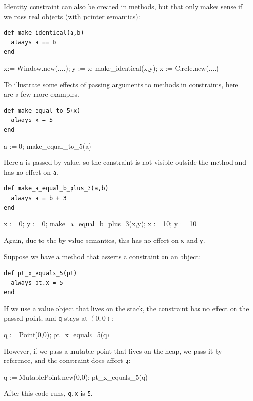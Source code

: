 \documentclass{article}
\newcounter{examples}
\begin{document}
Identity constraint can also be created in methods, but that only
makes sense if we pass real objects (with pointer semantics):
\begin{verbatim}
def make_identical(a,b)
  always a == b
end
\end{verbatim}

\begin{example}
x:= Window.new(....);
y := x;
make_identical(x,y);
x := Circle.new(....)
\end{example}

To illustrate some effects of passing arguments to methods in
constraints, here are a few more examples.

\begin{verbatim}
def make_equal_to_5(x)
  always x = 5
end
\end{verbatim}

\begin{example}
a := 0;
make_equal_to_5(a)
\end{example}
Here a is passed by-value, so the constraint is not visible outside
the method and has no effect on \verb!a!.

\begin{verbatim}
def make_a_equal_b_plus_3(a,b)
  always a = b + 3
end
\end{verbatim}

\begin{example}
x := 0;
y := 0;
make_a_equal_b_plus_3(x,y);
x := 10;
y := 10
\end{example}
Again, due to the by-value semantics, this has no effect on \verb!x!
and \verb!y!.

Suppose we have a method that asserts a constraint on an object:
\begin{verbatim}
def pt_x_equals_5(pt)
  always pt.x = 5
end
\end{verbatim}

If we use a value object that lives on the stack, the constraint has
no effect on the passed point, and \verb!q! stays at $(0,0)$:
\begin{example}
q := Point(0,0);
pt_x_equals_5(q)
\end{example}

However, if we pass a mutable point that lives on the heap, we pass it
by-reference, and the constraint does affect \verb!q!:
\begin{example}
q := MutablePoint.new(0,0);
pt_x_equals_5(q)
\end{example}
After this code runs, \verb!q.x! is \verb!5!.
\end{document}
